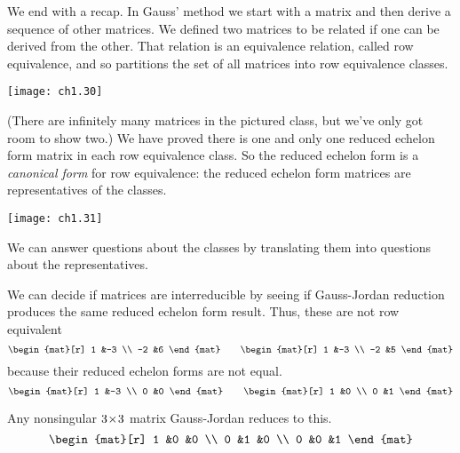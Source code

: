 We end with a recap.
In Gauss' method we start with a matrix and then
derive a sequence of other matrices.
We defined two matrices to be related if one can be derived from the other.
That relation is an equivalence relation, %
called row equivalence, and
so partitions the set of all matrices into row equivalence classes.
\begin{center}
  \texttt{[image: ch1.30]}
\end{center}
(There are infinitely many matrices in the pictured class, but we've only
got room to show two.)
We have proved there is one and only one reduced echelon form matrix in
each row equivalence class.
So the reduced echelon form is a
{\em canonical form}%
%
%
for row equivalence:
the reduced echelon form matrices are
representatives of the classes.
\begin{center}
  \texttt{[image: ch1.31]}
\end{center}
We can answer questions about the classes by translating them
into questions about the representatives.

\begin{example}  \label{ex:MatsNotRowEq}
We can decide if matrices are interreducible
by seeing if Gauss-Jordan reduction produces the same
reduced echelon form result.
Thus, these are not row equivalent
\begin{equation*}
  \begin{mat}[r]
    1  &-3  \\
   -2  &6
  \end{mat}
  \qquad
  \begin{mat}[r]
    1  &-3  \\
   -2  &5
  \end{mat}
\end{equation*}
because their reduced echelon forms are not equal.
\begin{equation*}
  \begin{mat}[r]
    1  &-3  \\
    0  &0
  \end{mat}
  \qquad
  \begin{mat}[r]
    1  &0   \\
    0  &1
  \end{mat}
\end{equation*}
\end{example}

\begin{example}
Any nonsingular \( 3 \! \times \! 3 \) matrix Gauss-Jordan reduces to this.
\begin{equation*}
    \begin{mat}[r]
      1  &0  &0 \\
      0  &1  &0 \\
      0  &0  &1
    \end{mat}
\end{equation*}
\end{example}

